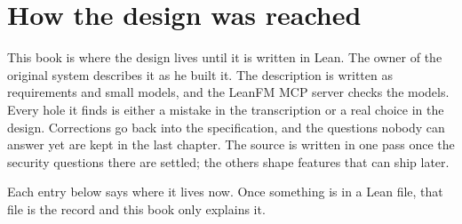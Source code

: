 \chapter{How the design was reached}
This book is where the design lives until it is written in Lean. The owner of
the original system describes it as he built it. The description is written as
requirements and small models, and the LeanFM MCP server checks the models. Every
hole it finds is either a mistake in the transcription or a real choice in the
design. Corrections go back into the specification, and the questions nobody can
answer yet are kept in the last chapter. The source is written in one pass once
the security questions there are settled; the others shape features that can
ship later.

Each entry below says where it lives now. Once something is in a Lean file, that
file is the record and this book only explains it.


